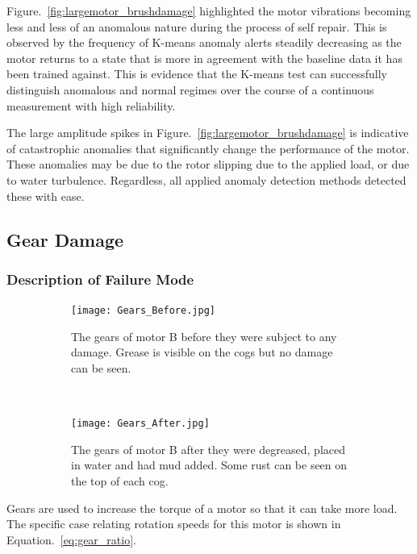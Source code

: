 Figure.~\ref{fig:largemotor_brushdamage} highlighted the motor vibrations becoming less and less of an anomalous nature during the process of self repair. This is observed by the frequency of K-means anomaly alerts steadily decreasing as the motor returns to a state that is more in agreement with the baseline data it has been trained against. This is evidence that the K-means test can successfully distinguish anomalous and normal regimes over the course of a continuous measurement with high reliability.

The large amplitude spikes in Figure.~\ref{fig:largemotor_brushdamage} is indicative of catastrophic anomalies that significantly change the performance of the motor. These anomalies may be due to the rotor slipping due to the applied load, or due to water turbulence. Regardless, all applied anomaly detection methods detected these with ease.


\subsection{Gear Damage}

\subsubsection{Description of Failure Mode}

\begin{figure}[t!]
    \centering
    \begin{subfigure}[t]{0.5\textwidth}
        \centering
        \texttt{[image: Gears\_Before.jpg]}
        \caption[Healthy Gears]{The gears of motor B before they were subject to any damage. Grease is visible on the cogs but no damage can be seen.}
    \end{subfigure}%
    ~ 
    \begin{subfigure}[t]{0.5\textwidth}
        \centering
         \texttt{[image: Gears\_After.jpg]}
    \caption[Damaged Gears]{The gears of motor B after they were degreased, placed in water and had mud added. Some rust can be seen on the top of each cog.}
    \end{subfigure}
    \caption[Motor Gears]{}
    \label{fig:gear_damage}
\end{figure}

Gears are used to increase the torque of a motor so that it can take more load. The specific case relating rotation speeds for this motor is shown in Equation.~\eqref{eq:gear_ratio}.

